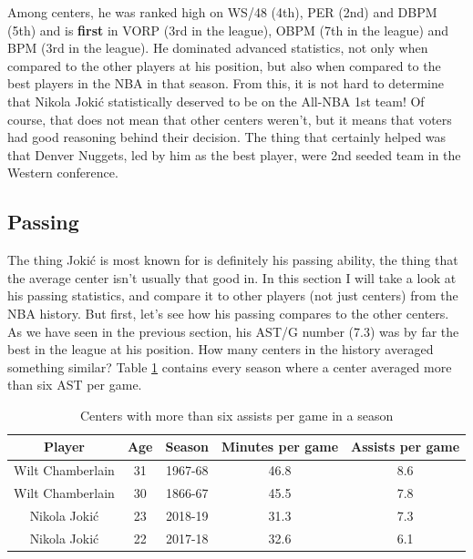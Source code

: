 \documentclass[a4paper]{article}
\begin{document}
Among centers, he was ranked high on WS/48 (4th), PER (2nd) and DBPM (5th) and is \textbf{first} in VORP (3rd in the league), OBPM (7th in the league) and BPM (3rd in the league). He dominated advanced statistics, not only when compared to the other players at his position, but also when compared to the best players in the NBA in that season. From this, it is not hard to determine that Nikola Joki\' c statistically deserved to be on the All-NBA 1st team! Of course, that does not mean that other centers weren't, but it means that voters had good reasoning behind their decision. The thing that certainly helped was that Denver Nuggets, led by him as the best player, were 2nd seeded team in the Western conference.

\subsection{Passing}
\label{subsec:jokic_passing}

The thing Joki\' c is most known for is definitely his passing ability, the thing that the average center isn't usually that good in. In this section I will take a look at his passing statistics, and compare it to other players (not just centers) from the NBA history. But first, let's see how his passing compares to the other centers. As we have seen in the previous section, his AST/G number (7.3) was by far the best in the league at his position. How many centers in the history averaged something similar? Table \ref{tab:centers_ast_g} contains every season where a center averaged more than six AST per game.

\begin{table}[h!]
\begin{center}
\begin{tabular}{|c|c|c|c|c|} \hline
\textbf{Player} & \textbf{Age} & \textbf{Season} & \textbf{Minutes per game} & \textbf{Assists per game} \\ \hline
Wilt Chamberlain & 31 & 1967-68 & 46.8 & 8.6 \\ \hline
Wilt Chamberlain & 30 & 1866-67 & 45.5 & 7.8\\ \hline
Nikola Jokić & 23 & 2018-19 & 31.3 & 7.3 \\ \hline
Nikola Jokić & 22 & 2017-18 & 32.6 & 6.1 \\ \hline
\end{tabular}
\caption{Centers with more than six assists per game in a season}
\label{tab:centers_ast_g}
\end{center}
\end{table}
\end{document}
